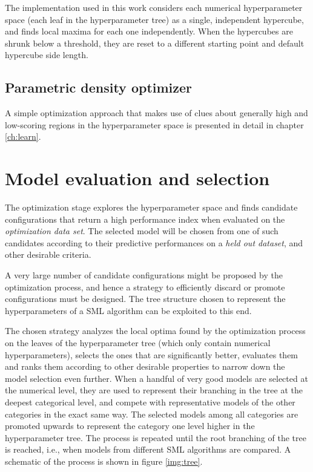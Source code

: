 The implementation used in this work considers each numerical hyperparameter space (each leaf in the
hyperparameter tree) as a single, independent hypercube, and finds local maxima for each one
independently. When the hypercubes are shrunk below a threshold, they are reset to a different
starting point and default hypercube side length.

\subsection{Parametric density optimizer}
A simple optimization approach that makes use of clues about generally high and low-scoring regions in the
hyperparameter space is presented in detail in chapter \ref{ch:learn}.


\section{Model evaluation and selection}
The optimization stage explores the hyperparameter space and finds candidate configurations that
return a high performance index when evaluated on the \emph{optimization data set}. The selected
model will be chosen from one of such candidates according to their predictive performances on a
\emph{held out dataset}, and other desirable criteria.

A very large number of candidate configurations might be proposed by the optimization process, and
hence a strategy to efficiently discard or promote configurations must be designed. 
The tree structure chosen to represent the hyperparameters of a SML algorithm can be exploited to
this end.

The chosen strategy analyzes the local optima found by the optimization process on the leaves of the
hyperparameter tree (which only contain numerical hyperparameters), selects the ones that are
significantly better, evaluates them and ranks them according to other desirable properties to
narrow down the model selection even further. When a handful of very good models are selected at the
numerical level, they are used to represent their branching in the tree at the deepest categorical
level, and compete with representative models of the other categories in the exact same way. The selected
models among all categories are promoted upwards to represent the category one level higher in the
hyperparameter tree. The process is repeated until the root branching of the tree is reached, i.e.,
when models from different SML algorithms are compared. A schematic of the process is shown in
figure \ref{img:tree}.

